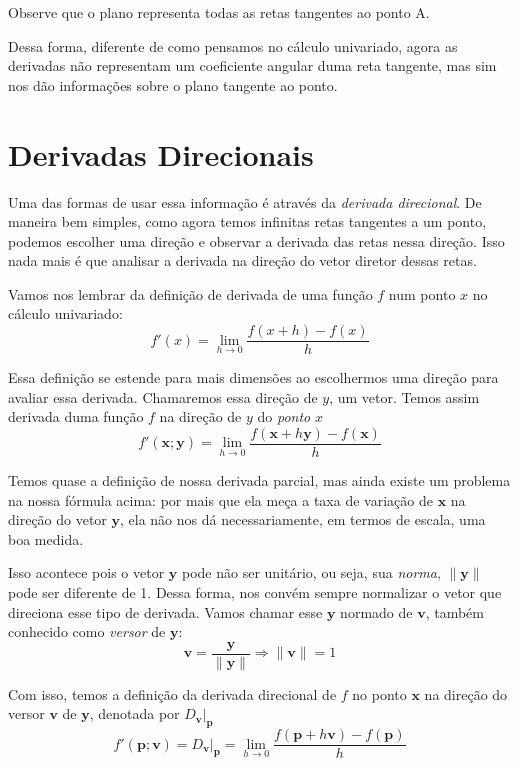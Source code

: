 \documentclass[
  letterpaper,
  DIV=11,
  numbers=noendperiod]{scrreprt}
\begin{document}
Observe que o plano representa todas as retas tangentes ao ponto A.

Dessa forma, diferente de como pensamos no cálculo univariado, agora as
derivadas não representam um coeficiente angular duma reta tangente, mas
sim nos dão informações sobre o plano tangente ao ponto.

\section{Derivadas Direcionais}\label{derivadas-direcionais}

Uma das formas de usar essa informação é através da \emph{derivada
direcional}. De maneira bem simples, como agora temos infinitas retas
tangentes a um ponto, podemos escolher uma direção e observar a derivada
das retas nessa direção. Isso nada mais é que analisar a derivada na
direção do vetor diretor dessas retas.

Vamos nos lembrar da definição de derivada de uma função \(f\) num ponto
\(x\) no cálculo univariado: \[
f'(x) = \lim_{h\rightarrow 0} \frac{f(x+h)-f(x)}{h}
\]

Essa definição se estende para mais dimensões ao escolhermos uma direção
para avaliar essa derivada. Chamaremos essa direção de \(y\), um vetor.
Temos assim derivada duma função \(f\) na direção de \(y\) do
\emph{ponto} \(x\) \[
f'(\pmb{x};\pmb{y}) = \lim_{h\rightarrow 0} \frac{f(\pmb{x}+h\pmb{y})-f(\pmb{x})}{h} 
\]

Temos quase a definição de nossa derivada parcial, mas ainda existe um
problema na nossa fórmula acima: por mais que ela meça a taxa de
variação de \(\pmb{x}\) na direção do vetor \(\pmb{y}\), ela não nos dá
necessariamente, em termos de escala, uma boa medida.

Isso acontece pois o vetor \(\pmb{y}\) pode não ser unitário, ou seja,
sua \emph{norma}, \(\lVert \pmb{y} \rVert\) pode ser diferente de 1.
Dessa forma, nos convém sempre normalizar o vetor que direciona esse
tipo de derivada. Vamos chamar esse \(\pmb{y}\) normado de \(\pmb{v}\),
também conhecido como \emph{versor} de \(\pmb{y}\): \[
\pmb{v} = \frac{\pmb{y}}{\lVert \pmb{y} \rVert} \Rightarrow \lVert \pmb{v} \rVert = 1
\]

Com isso, temos a definição da derivada direcional de \(f\) no ponto
\(\pmb{x}\) na direção do versor \(\pmb{v}\) de \(\pmb{y}\), denotada
por \(D_{\pmb{v}}\rvert_{\pmb{p}}\) \[
f'(\pmb{p};\pmb{v})= D_{\pmb{v}}\rvert_{\pmb{p}} = \lim_{h\rightarrow 0} \frac{f(\pmb{p}+h\pmb{v})-f(\pmb{p})}{h} 
\]
\end{document}
